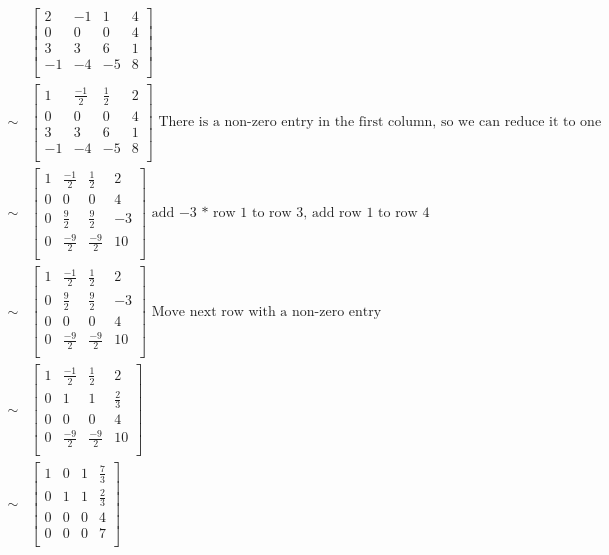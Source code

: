 \begin{align*}
	&\begin{bmatrix}
		2&-1& 1 & 4\\
		0&0&0&4\\
		3&3&6&1\\
		-1& -4& -5 & 8\\
	\end{bmatrix}\\
	\sim & \begin{bmatrix}
		1&\frac{-1}{2}& \frac{1}{2} & 2\\
		0&0&0&4\\
		3&3&6&1\\
		-1& -4& -5 & 8\\
	\end{bmatrix} \textrm{ There is a non-zero entry in the first column, so we can reduce it to one}\\
	\sim & \begin{bmatrix}
		1&\frac{-1}{2}& \frac{1}{2} & 2\\
		0&0&0&4\\
		0&\frac{9}{2}&\frac{9}{2}&-3\\
		0& \frac{-9}{2}& \frac{-9}{2} & 10\\
	\end{bmatrix} \textrm{ add $-3$ * row $1$ to row $3$, add row $1$ to row $4$}\\
	\sim & \begin{bmatrix}
		1&\frac{-1}{2}& \frac{1}{2} & 2\\
		0&\frac{9}{2}&\frac{9}{2}&-3\\
		0&0&0&4\\
		0& \frac{-9}{2}& \frac{-9}{2} & 10\\
	\end{bmatrix} \textrm{ Move next row with a non-zero entry}\\
	\sim & \begin{bmatrix}
		1&\frac{-1}{2}& \frac{1}{2} & 2\\
		0&1&1&\frac{2}{3}\\
		0&0&0&4\\
		0& \frac{-9}{2}& \frac{-9}{2} & 10\\
	\end{bmatrix} \\
	\sim & \begin{bmatrix}
		1&0& 1 & \frac{7}{3}\\
		0&1&1&\frac{2}{3}\\
		0&0&0&4\\
		0& 0&0 & 7\\

\end{bmatrix}
\end{align*}
